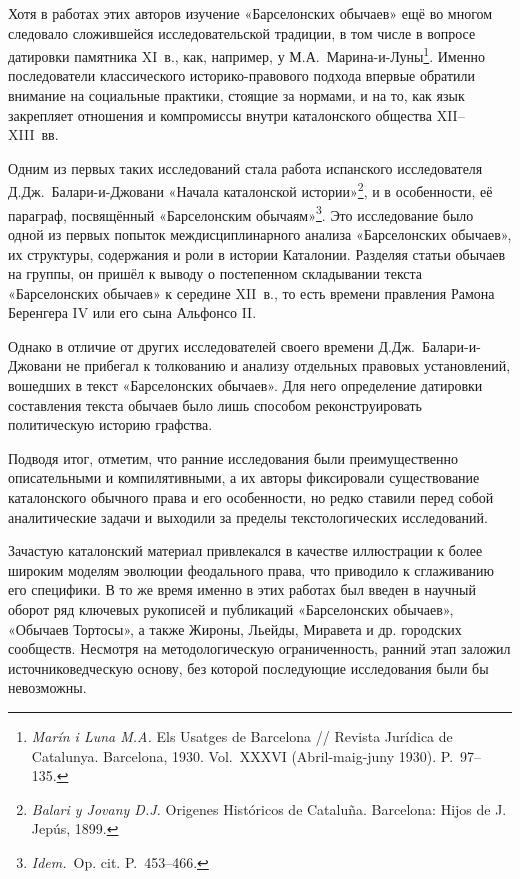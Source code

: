 Хотя в работах этих авторов изучение «Барселонских обычаев» ещё во многом следовало сложившейся исследовательской традиции, в том числе в вопросе датировки памятника XI~в., как, например, у М.А.~Марина-и-Луны\footnote{\emph{Marín i Luna M.A.} Els Usatges de Barcelona // Revista Jurídica de Catalunya. Barcelona, 1930. Vol.~XXXVI (Abril-maig-juny 1930). P.~97--135.}. Именно последователи классического историко-правового подхода впервые обратили внимание на социальные практики, стоящие за нормами, и на то, как язык закрепляет отношения и компромиссы внутри каталонского общества XII--XIII~вв.

Одним из первых таких исследований стала работа испанского исследователя Д.Дж.~Балари-и-Джовани «Начала каталонской истории»\footnote{\emph{Balari y Jovany D.J.} Origenes Históricos de Cataluña. Barcelona: Hijos de J. Jepús, 1899.}, и в особенности, её параграф, посвящённый «Барселонским обычаям»\footnote{\emph{Idem.}~Op. cit. P.~453--466.}. Это исследование было одной из первых попыток междисциплинарного анализа «Барселонских обычаев», их структуры, содержания и роли в истории Каталонии. Разделяя статьи обычаев на группы, он пришёл к выводу о постепенном складывании текста «Барселонских обычаев» к середине XII~в., то есть времени правления Рамона Беренгера IV или его сына Альфонсо II.

Однако в отличие от других исследователей своего времени Д.Дж.~Балари-и-Джовани не прибегал к толкованию и анализу отдельных правовых установлений, вошедших в текст «Барселонских обычаев». Для него определение датировки составления текста обычаев было лишь способом реконструировать политическую историю графства.

Подводя итог, отметим, что ранние исследования были преимущественно описательными и компилятивными, а их авторы фиксировали существование каталонского обычного права и его особенности, но редко ставили перед собой аналитические задачи и выходили за пределы текстологических исследований.

Зачастую каталонский материал привлекался в качестве иллюстрации к более широким моделям эволюции феодального права, что приводило к сглаживанию его специфики. В то же время именно в этих работах был введен в научный оборот ряд ключевых рукописей и публикаций «Барселонских обычаев», «Обычаев Тортосы», а также Жироны, Льейды, Миравета и др. городских сообществ. Несмотря на методологическую ограниченность, ранний этап заложил источниковедческую основу, без которой последующие исследования были бы невозможны.

